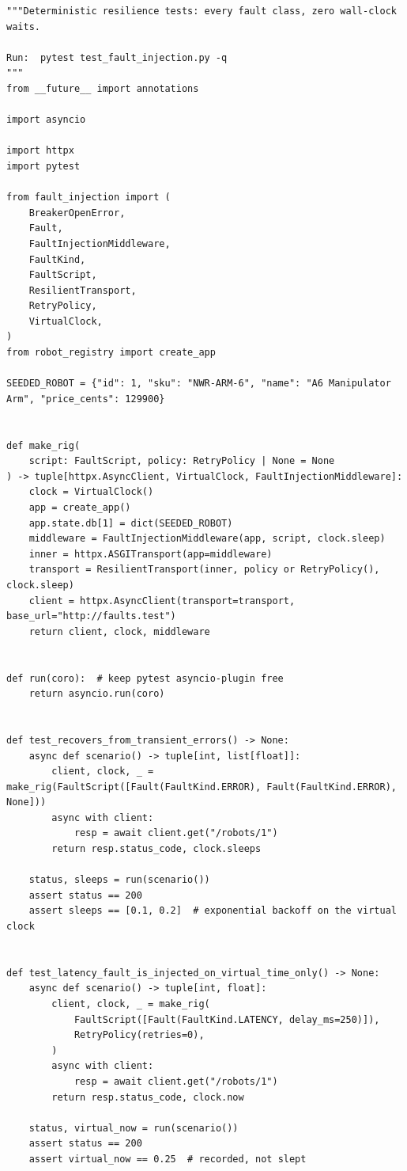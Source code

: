 \begin{verbatim}
"""Deterministic resilience tests: every fault class, zero wall-clock waits.

Run:  pytest test_fault_injection.py -q
"""
from __future__ import annotations

import asyncio

import httpx
import pytest

from fault_injection import (
    BreakerOpenError,
    Fault,
    FaultInjectionMiddleware,
    FaultKind,
    FaultScript,
    ResilientTransport,
    RetryPolicy,
    VirtualClock,
)
from robot_registry import create_app

SEEDED_ROBOT = {"id": 1, "sku": "NWR-ARM-6", "name": "A6 Manipulator Arm", "price_cents": 129900}


def make_rig(
    script: FaultScript, policy: RetryPolicy | None = None
) -> tuple[httpx.AsyncClient, VirtualClock, FaultInjectionMiddleware]:
    clock = VirtualClock()
    app = create_app()
    app.state.db[1] = dict(SEEDED_ROBOT)
    middleware = FaultInjectionMiddleware(app, script, clock.sleep)
    inner = httpx.ASGITransport(app=middleware)
    transport = ResilientTransport(inner, policy or RetryPolicy(), clock.sleep)
    client = httpx.AsyncClient(transport=transport, base_url="http://faults.test")
    return client, clock, middleware


def run(coro):  # keep pytest asyncio-plugin free
    return asyncio.run(coro)


def test_recovers_from_transient_errors() -> None:
    async def scenario() -> tuple[int, list[float]]:
        client, clock, _ = make_rig(FaultScript([Fault(FaultKind.ERROR), Fault(FaultKind.ERROR), None]))
        async with client:
            resp = await client.get("/robots/1")
        return resp.status_code, clock.sleeps

    status, sleeps = run(scenario())
    assert status == 200
    assert sleeps == [0.1, 0.2]  # exponential backoff on the virtual clock


def test_latency_fault_is_injected_on_virtual_time_only() -> None:
    async def scenario() -> tuple[int, float]:
        client, clock, _ = make_rig(
            FaultScript([Fault(FaultKind.LATENCY, delay_ms=250)]),
            RetryPolicy(retries=0),
        )
        async with client:
            resp = await client.get("/robots/1")
        return resp.status_code, clock.now

    status, virtual_now = run(scenario())
    assert status == 200
    assert virtual_now == 0.25  # recorded, not slept



\end{verbatim}
